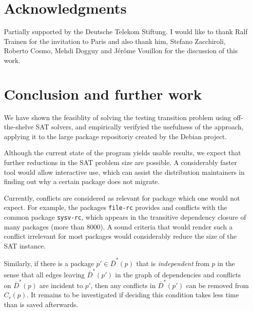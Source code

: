 \documentclass[halfparskip,11pt]{scrartcl}
\begin{document}
\section{Acknowledgments}

Partially supported by the Deutsche Telekom Stiftung. I would like to thank Ralf Trainen for the invitation to Paris and also thank him, Stefano Zacchiroli, Roberto Cosmo, Mehdi Dogguy and Jérôme Vouillon for the discussion of this work.

\section{Conclusion and further work}

We have shown the feasiblity of solving the testing transition problem using off-the-shelve SAT solvers, and empirically verifyied the usefulness of the approach, applying it to the large package repositoriy created by the Debian project.

Although the current state of the program yields usable results, we expect that further reductions in the SAT problem size are possible. A considerably faster tool would allow interactive use, which can assist the distribution maintainers in finding out why a certain package does not migrate.

Currently, conflicts are considered as relevant for package which one would not expect. For example, the packages \texttt{file-rc} provides and conflicts with the common package \texttt{sysv-rc}, which appears in the transitive dependency closure of many packages (more than 8000). A sound criteria that would render such a conflict irrelevant for most packages would considerably reduce the size of the SAT instance.

Similarly, if there is a package $p'\in \bar D^*(p)$ that is \emph{independent} from $p$ in the sense that all edges leaving $\bar D^*(p')$ in the graph of dependencies and conflicts on $\bar D^*(p)$ are incident to $p'$, then any conflicts in $\bar D^*(p')$ can be removed from $C_r(p)$. It remains to be investigated if deciding this condition takes less time than is saved afterwards.




\end{document}
